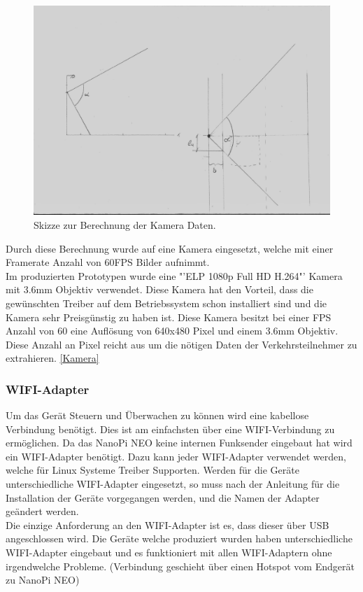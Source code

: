 \begin{figure}[H]
  \centering
  \includegraphics[height=0.49\textwidth]{Hardware/ObjektivBerechnung.jpg} 
  \caption{Skizze zur Berechnung der Kamera Daten.}
  \label{bBerechnung}
\end{figure}

Durch diese Berechnung wurde auf eine Kamera eingesetzt, welche mit einer Framerate Anzahl von 60FPS Bilder aufnimmt. \\
Im produzierten Prototypen wurde eine "'ELP 1080p Full HD H.264"' Kamera mit 3.6mm Objektiv verwendet. Diese Kamera hat den Vorteil, dass die gewünschten Treiber auf dem Betriebssystem schon installiert sind und die Kamera sehr Preisgünstig zu haben ist. Diese Kamera besitzt bei einer FPS Anzahl von 60 eine Auflösung von 640x480 Pixel und einem 3.6mm Objektiv. Diese Anzahl an Pixel reicht aus um die nötigen Daten der Verkehrsteilnehmer zu extrahieren. \ref{Kamera}

\subsubsection{WIFI-Adapter}
Um das Gerät Steuern und Überwachen zu können wird eine kabellose Verbindung benötigt. Dies ist am einfachsten über eine WIFI-Verbindung zu ermöglichen. Da das NanoPi NEO keine internen Funksender eingebaut hat wird ein WIFI-Adapter benötigt. Dazu kann jeder WIFI-Adapter verwendet werden, welche für Linux Systeme Treiber Supporten. Werden für die Geräte unterschiedliche WIFI-Adapter eingesetzt, so muss nach der Anleitung für die Installation der Geräte vorgegangen werden, und die Namen der Adapter geändert werden.\\
Die einzige Anforderung an den WIFI-Adapter ist es, dass dieser über USB angeschlossen wird. Die Geräte welche produziert wurden haben unterschiedliche WIFI-Adapter eingebaut und es funktioniert mit allen WIFI-Adaptern ohne irgendwelche Probleme. (Verbindung geschieht über einen Hotspot vom Endgerät zu NanoPi NEO)

